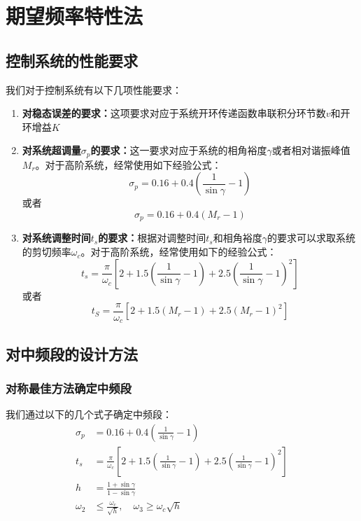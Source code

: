 \section{期望频率特性法}

\subsection{控制系统的性能要求}
我们对于控制系统有以下几项性能要求：
\begin{enumerate}
    \item \textbf{对稳态误差的要求：}这项要求对应于系统开环传递函数串联积分环节数$v$和开环增益$K$
    \item \textbf{对系统超调量$\sigma_p$的要求：}这一要求对应于系统的相角裕度$\gamma$或者相对谐振峰值$M_r$。对于高阶系统，经常使用如下经验公式：
    \begin{equation*}
        \sigma_p = 0.16 + 0.4 \left(\frac{1}{\sin \gamma} - 1\right)
    \end{equation*}
    或者
    \begin{equation*}
        \sigma_p = 0.16 + 0.4 (M_r - 1)
    \end{equation*}
    \item \textbf{对系统调整时间$t_s$的要求：}根据对调整时间$t_s$和相角裕度$\gamma$的要求可以求取系统的剪切频率$\omega_c$。对于高阶系统，经常使用如下的经验公式：
    \begin{equation*}
        t_s = \frac{\pi}{\omega_c}\left[2 + 1.5\left(\frac{1}{\sin \gamma} - 1\right) + 2.5 \left(\frac{1}{\sin\gamma} - 1\right)^2 \right]
    \end{equation*}
    或者
    \begin{equation*}
        t_S = \frac{\pi}{\omega_c}\left[ 2 + 1.5(M_r - 1) + 2.5 (M_r - 1)^2 \right]
    \end{equation*}
\end{enumerate}

\subsection{对中频段的设计方法}

\subsubsection{对称最佳方法确定中频段}
我们通过以下的几个式子确定中频段：
\begin{equation*}
    \begin{split}
        \sigma_p &= 0.16 + 0.4\left(\frac{1}{\sin \gamma} - 1\right) \\
        t_s &= \frac{\pi}{\omega_c} \left[ 2 + 1.5 \left( \frac{1}{\sin \gamma} - 1\right) + 2.5 \left(\frac{1}{\sin \gamma} - 1\right)^2\right] \\ 
        h &= \frac{1 + \sin \gamma}{1-\sin\gamma} \\
        \omega_2 & \leq \frac{\omega_c}{\sqrt{h}} , \quad \omega_3 \geq \omega_c \sqrt{h}\\
    \end{split}
\end{equation*}

